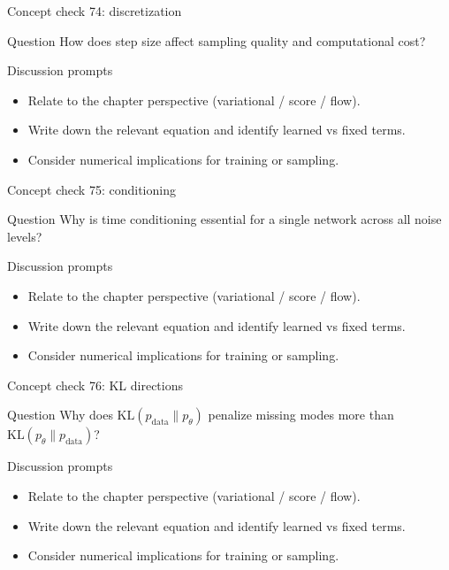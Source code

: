 \documentclass[aspectratio=169]{beamer}
\begin{document}
\begin{frame}{Concept check 74: discretization}
\begin{block}{Question}
How does step size affect sampling quality and computational cost?
\end{block}
\begin{block}{Discussion prompts}
\begin{itemize}
\item Relate to the chapter perspective (variational / score / flow).
\item Write down the relevant equation and identify learned vs fixed terms.
\item Consider numerical implications for training or sampling.
\end{itemize}
\end{block}
\end{frame}

\begin{frame}{Concept check 75: conditioning}
\begin{block}{Question}
Why is time conditioning essential for a single network across all noise levels?
\end{block}
\begin{block}{Discussion prompts}
\begin{itemize}
\item Relate to the chapter perspective (variational / score / flow).
\item Write down the relevant equation and identify learned vs fixed terms.
\item Consider numerical implications for training or sampling.
\end{itemize}
\end{block}
\end{frame}

\begin{frame}{Concept check 76: KL directions}
\begin{block}{Question}
Why does \(\mathrm{KL}(p_{\text{data}}\|p_\theta)\) penalize missing modes more than \(\mathrm{KL}(p_\theta\|p_{\text{data}})\)?
\end{block}
\begin{block}{Discussion prompts}
\begin{itemize}
\item Relate to the chapter perspective (variational / score / flow).
\item Write down the relevant equation and identify learned vs fixed terms.
\item Consider numerical implications for training or sampling.
\end{itemize}
\end{block}
\end{frame}
\end{document}
